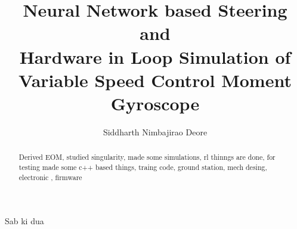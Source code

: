 \documentclass[english,oneside,LaM,binding=0.0cm]{sapthesis}
\title{Neural Network based Steering and \\ Hardware in Loop Simulation of Variable Speed Control Moment Gyroscope}
\author{Siddharth Nimbajirao Deore}
\begin{document}
\frontmatter
\maketitle
\dedication{Dedicated to\\ Aai and Aaba}

\begin{abstract}
{}
Derived EOM, studied singularity, made some simulations, rl thinngs are done, for testing made some c++ based things, traing code, ground station, mech desing, electronic , firmware
\end{abstract}

\begin{acknowledgments}
{}
Sab ki dua

\end{acknowledgments}
\begin{comment}

\newglossaryentry{policy}{
    name = policy,
    description = neural network which produces appropriate actions.
}
\end{comment}



\renewcommand{\contentsname}{Table of Contents}
\tableofcontents

\listoftables

\listoffigures


\printacronyms[type=\acronymtype, title=List of Acronyms]




\nomlabelwidth=25mm 

\renewcommand\nomgroup[1]{%
  \item[\bfseries
  \ifstrequal{#1}{A}{Spacecraft Attitude Dynamics}{%
  \ifstrequal{#1}{B}{AI based Learning Agent}{%
  \ifstrequal{#1}{C}{Other Symbols}{}}}%
]}

\printnomenclature
{}
\end{document}
